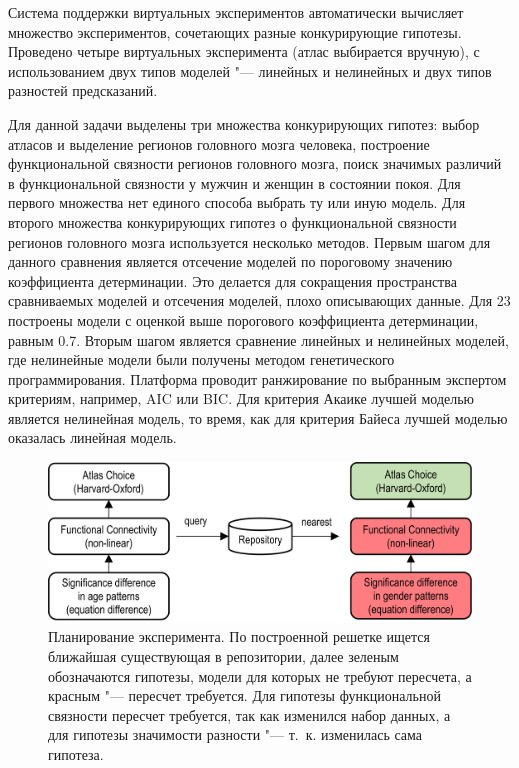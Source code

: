 Система поддержки виртуальных экспериментов автоматически вычисляет множество экспериментов, сочетающих разные 
конкурирующие гипотезы. Проведено четыре виртуальных эксперимента (атлас выбирается вручную), с использованием 
двух типов моделей "--- линейных и нелинейных и двух типов разностей предсказаний.

Для данной задачи выделены три множества конкурирующих гипотез: выбор атласов и выделение регионов головного 
мозга человека, построение функциональной связности регионов головного мозга, поиск значимых различий в 
функциональной связности у мужчин и женщин в состоянии покоя. Для первого множества нет единого способа выбрать 
ту или иную модель. Для второго множества конкурирующих гипотез о функциональной связности регионов 
головного мозга используется несколько 
методов. Первым шагом для данного сравнения является отсечение моделей по пороговому значению коэффициента 
детерминации. Это делается для сокращения пространства сравниваемых моделей и отсечения моделей, плохо описывающих 
данные. Для 23 построены модели с оценкой 
выше порогового коэффициента детерминации, равным 0.7. Вторым шагом является сравнение линейных и нелинейных 
моделей, где нелинейные модели были получены методом генетического программирования. 
Платформа проводит ранжирование по выбранным экспертом критериям, например, AIC или BIC.
Для критерия Акаике лучшей моделью является нелинейная модель, то время, как для 
критерия Байеса лучшей моделью оказалась линейная модель.


\begin{figure}[ht]
    \centering
    \includegraphics[width=1.0\linewidth]{images/planning.pdf}
    \caption{Планирование эксперимента. По построенной решетке ищется ближайшая существующая в репозитории,
     далее зеленым обозначаются гипотезы, модели для которых не требуют пересчета, а красным "--- пересчет требуется.
     Для гипотезы функциональной связности пересчет требуется, так как изменился набор данных, а для гипотезы 
     значимости разности "--- т.~к. изменилась сама гипотеза.
     }\label{fig:planning}
\end{figure}

